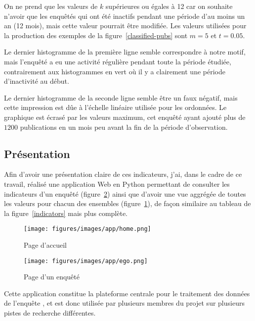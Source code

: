 On ne prend que les valeurs de $k$ supérieures ou égales à 12 car on souhaite
n’avoir que les enquêtés qui ont été inactifs pendant une période d’au moins un
an (12 mois), mais cette valeur pourrait être modifiée. Les valeurs utilisées
pour la production des exemples de la figure~\ref{classified-pubs} sont $m=5$
et $t=0.05$.

Le dernier histogramme de la première ligne semble correspondre à notre motif,
mais l’enquêté a eu une activité régulière pendant toute la période étudiée,
contrairement aux histogrammes en vert où il y a clairement une période
d’inactivité au début.

Le dernier histogramme de la seconde ligne semble être un faux négatif, mais
cette impression est dûe à l’échelle linéaire utilisée pour les ordonnées. Le
graphique est écrasé par les valeurs maximum, cet enquêté ayant ajouté plus de
$1 200$ publications en un mois peu avant la fin de la période d’observation.

\subsection{Présentation}

Afin d’avoir une présentation claire de ces indicateurs, j’ai, dans le cadre de
ce travail, réalisé une application Web en Python permettant de consulter les
indicateurs d’un enquêté (figure~\ref{app:ego}) ainsi que d’avoir une vue
aggrégée de toutes les valeurs pour chacun des ensembles
(figure~\ref{app:home}), de façon similaire au tableau de la
figure~\ref{indicators} mais plus complète.

\setlength{\abovecaptionskip}{0pt}
\begin{figure}[ht]
    \begin{center}
        \texttt{[image: figures/images/app/home.png]}
    \end{center}
    \caption{\label{app:home}Page d’accueil}
\end{figure}

\begin{figure}[ht]
    \begin{center}
        \texttt{[image: figures/images/app/ego.png]}
    \end{center}
    \caption{\label{app:ego}Page d’un enquêté}
\end{figure}
\setlength{\abovecaptionskip}{10pt}

Cette application constitue la plateforme centrale pour le traitement des
données de l’enquête , et est donc utilisée par plusieurs membres du
projet sur plusieurs pistes de recherche différentes.

